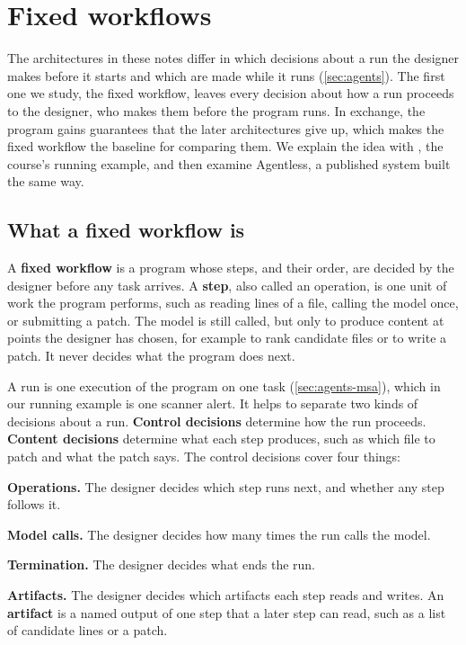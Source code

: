 \section{Fixed workflows}
\label{sec:fixed}

The architectures in these notes differ in which decisions about a run the designer makes before it
starts and which are made while it runs (\cref{sec:agents}). The first one we study, the fixed
workflow, leaves every decision about how a run proceeds to the designer, who makes them before the
program runs. In exchange, the program gains guarantees that the later architectures give up,
which makes the fixed workflow the baseline for comparing them. We explain the idea with
\msa{}, the course's running example, and then examine Agentless, a published system built the
same way.

\subsection{What a fixed workflow is}
\label{sec:fixed-definition}

A \textbf{fixed workflow} is a program whose steps, and their order, are decided by the designer
before any task arrives. A \textbf{step}, also called an operation, is one unit of work the program
performs, such as reading lines of a file, calling the model once, or submitting a patch. The model
is still called, but only to produce content at points the designer has chosen, for example to
rank candidate files or to write a patch. It never decides what the program does next.

A run is one execution of the program on one task (\cref{sec:agents-msa}), which in our running
example is one scanner alert. It helps to separate two kinds of decisions about a run. \textbf{Control decisions}
determine how the run proceeds. \textbf{Content decisions} determine what each step produces, such
as which file to patch and what the patch says. The control decisions cover four things:
\bi
\item \textbf{Operations.} The designer decides which step runs next, and whether any step follows
it.
\item \textbf{Model calls.} The designer decides how many times the run calls the model.
\item \textbf{Termination.} The designer decides what ends the run.
\item \textbf{Artifacts.} The designer decides which artifacts each step reads and writes. An
\textbf{artifact} is a named output of one step that a later step can read, such as a list of
candidate lines or a patch.
\ei

